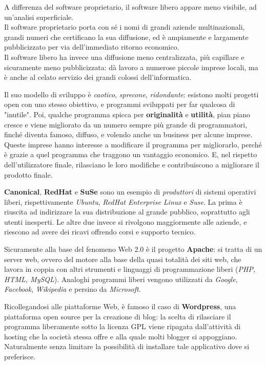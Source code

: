 \documentclass[a4paper, 12pt]{extarticle}
\begin{document}
A differenza del software proprietario, il software libero appare meno
visibile, ad un'analisi superficiale.\\
Il software proprietario porta
con sé i nomi di grandi aziende multinazionali, grandi numeri che
certificano la sua diffusione, ed è ampiamente e largamente
pubblicizzato per via dell'immediato ritorno economico.\\
Il software
libero ha invece una diffusione meno centralizzata, più capillare e
sicuramente meno pubblicizzata: dà lavoro a numerose piccole imprese
locali, ma è anche al celato servizio dei grandi colossi
dell'informatica.

Il suo modello di sviluppo è \textit{caotico}, \textit{sprecone},
\textit{ridondante}: esistono molti progetti open con uno stesso
obiettivo, e programmi sviluppati per far qualcosa di "inutile". Poi,
qualche programma spicca per \textbf{originalità} e \textbf{utilità},
pian piano cresce e viene migliorato da un numero sempre più grande di
programmatori, finché diventa famoso, diffuso, e volendo anche un
business per alcune imprese. Queste imprese hanno interesse a
modificare il programma per migliorarlo, perché è grazie a quel
programma che traggono un vantaggio economico. E, nel rispetto
dell'utilizzatore finale, rilasciano le loro modifiche e contribuiscono
a migliorare il prodotto finale.

\textbf{Canonical}, \textbf{RedHat} e \textbf{SuSe} sono un esempio di
\textit{produttori} di sistemi operativi liberi, rispettivamente
\textit{Ubuntu}, \textit{RedHat Enterprise Linux} e \textit{Suse}. La
prima è riuscita ad indirizzare la sua distribuzione al grande
pubblico, soprattutto agli utenti inesperti. Le altre due invece si
rivolgono maggiormente alle aziende, e riescono ad avere dei ricavi
offrendo corsi e supporto tecnico.

Sicuramente alla base del fenomeno Web 2.0 è il progetto
\textbf{Apache}: si tratta di un server web, ovvero del motore alla
base della quasi totalità dei siti web, che lavora in coppia con
altri strumenti e linguaggi di programmazione liberi (\textit{PHP, HTML,
MySQL}). Analoghi programmi liberi vengono utilizzati da
\textit{Google}, \textit{Facebook}, \textit{Wikipedia} e persino da \textit{Microsoft}.

Ricollegandosi alle piattaforme Web, è famoso il caso di
\textbf{Wordpress}, una piattaforma open source per la creazione di
blog: la scelta di rilasciare il programma liberamente sotto la licenza
GPL viene ripagata dall'attività di hosting che la società stessa offre
e alla quale molti blogger si appoggiano. Naturalmente senza limitare
la possibilità di installare tale applicativo dove si preferisce.
\end{document}
